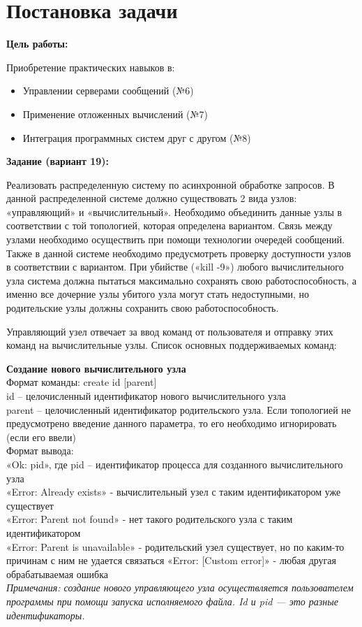 \section{Постановка задачи}

{\bfseries Цель работы:} 

Приобретение практических навыков в:

\begin{itemize}
    \item Управлении серверами сообщений (№6)
    \item Применение отложенных вычислений (№7)
    \item Интеграция программных систем друг с другом (№8)
\end{itemize}

{\bfseries Задание (вариант 19):} 

Реализовать распределенную систему по асинхронной обработке запросов. В данной
распределенной системе должно существовать 2 вида узлов: «управляющий» и
«вычислительный». Необходимо объединить данные узлы в соответствии с той топологией,
которая определена вариантом. Связь между узлами необходимо осуществить при помощи
технологии очередей сообщений. Также в данной системе необходимо предусмотреть проверку
доступности узлов в соответствии с вариантом. При убийстве («kill -9») любого вычислительного
узла система должна пытаться максимально сохранять свою работоспособность, а именно все
дочерние узлы убитого узла могут стать недоступными, но родительские узлы должны сохранить
свою работоспособность.

Управляющий узел отвечает за ввод команд от пользователя и отправку этих команд на
вычислительные узлы. Список основных поддерживаемых команд:

\textbf{Создание нового вычислительного узла}\\
Формат команды: create id [parent]\\
id – целочисленный идентификатор нового вычислительного узла\\
parent – целочисленный идентификатор родительского узла. Если топологией не предусмотрено
введение данного параметра, то его необходимо игнорировать (если его ввели)\\
Формат вывода:\\
«Ok: pid», где pid – идентификатор процесса для созданного вычислительного узла\\
«Error: Already exists» - вычислительный узел с таким идентификатором уже существует\\
«Error: Parent not found» - нет такого родительского узла с таким идентификатором\\
«Error: Parent is unavailable» - родительский узел существует, но по каким-то причинам с ним не
удается связаться
«Error: [Custom error]» - любая другая обрабатываемая ошибка\\
\textit{Примечания: создание нового управляющего узла осуществляется пользователем программы
при помощи запуска исполняемого файла. Id и pid — это разные идентификаторы.
}\\


